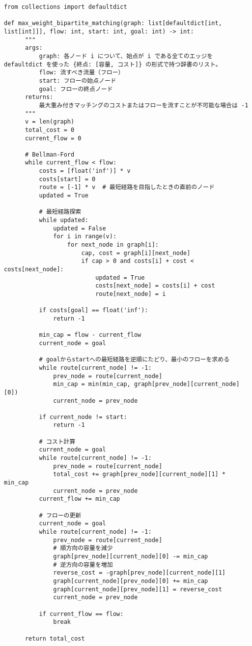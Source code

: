 \documentclass{jlreq}
\begin{document}
\begin{lstlisting}[caption=重み付き二部グラフの最大マッチング問題の実装, label=weighted_bipartite_matching, frame=TRBL, label={weighted_bipartite_matching}]
from collections import defaultdict

def max_weight_bipartite_matching(graph: list[defaultdict[int, list[int]]], flow: int, start: int, goal: int) -> int:
      """
      args:
          graph: 各ノード i について、始点が i である全てのエッジを defaultdict を使った {終点: [容量, コスト]} の形式で持つ辞書のリスト。
          flow: 流すべき流量（フロー）
          start: フローの始点ノード
          goal: フローの終点ノード
      returns:
          最大重み付きマッチングのコストまたはフローを流すことが不可能な場合は -1
      """
      v = len(graph)
      total_cost = 0
      current_flow = 0
  
      # Bellman-Ford 
      while current_flow < flow:
          costs = [float('inf')] * v
          costs[start] = 0
          route = [-1] * v  # 最短経路を目指したときの直前のノード
          updated = True
  
          # 最短経路探索
          while updated:
              updated = False
              for i in range(v):
                  for next_node in graph[i]:
                      cap, cost = graph[i][next_node]
                      if cap > 0 and costs[i] + cost < costs[next_node]:
                          updated = True
                          costs[next_node] = costs[i] + cost
                          route[next_node] = i
  
          if costs[goal] == float('inf'):
              return -1
  
          min_cap = flow - current_flow
          current_node = goal
  
          # goalからstartへの最短経路を逆順にたどり、最小のフローを求める
          while route[current_node] != -1:
              prev_node = route[current_node]
              min_cap = min(min_cap, graph[prev_node][current_node][0])
              current_node = prev_node
  
          if current_node != start:
              return -1
  
          # コスト計算
          current_node = goal
          while route[current_node] != -1:
              prev_node = route[current_node]
              total_cost += graph[prev_node][current_node][1] * min_cap
              current_node = prev_node
          current_flow += min_cap
  
          # フローの更新
          current_node = goal
          while route[current_node] != -1:
              prev_node = route[current_node]
              # 順方向の容量を減少
              graph[prev_node][current_node][0] -= min_cap
              # 逆方向の容量を増加
              reverse_cost = -graph[prev_node][current_node][1]
              graph[current_node][prev_node][0] += min_cap
              graph[current_node][prev_node][1] = reverse_cost
              current_node = prev_node
  
          if current_flow == flow:
              break
  
      return total_cost
\end{lstlisting}
\end{document}
